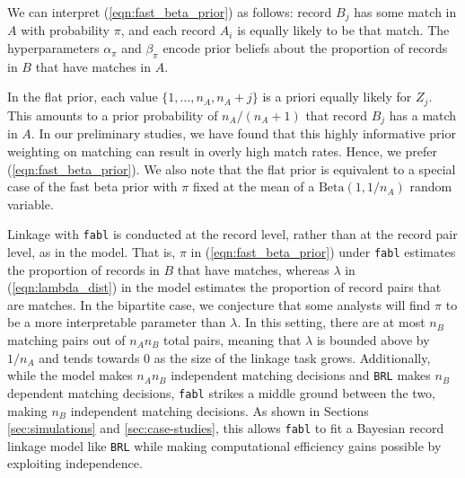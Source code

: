 \documentclass[ba]{imsart}
\begin{document}
We can interpret (\ref{eqn:fast_beta_prior}) as follows: record $B_j$ has some match in $A$ with probability $\pi$, and each record $A_i$ is equally likely to be that match. The hyperparameters $\alpha_{\pi}$ and $\beta_{\pi}$ encode prior beliefs about  the proportion of records in $B$ that have matches in $A.$ 

In the \cite{wortman2019} flat prior, each value $\{1, \ldots, n_A, n_A +j\}$ is a priori equally likely for $Z_j$. This amounts to a prior probability of $n_A / (n_A + 1)$ that record $B_j$ has a match in $A$. In our preliminary studies, we have found that this highly informative prior weighting on matching can result in overly high match rates. Hence, we prefer (\ref{eqn:fast_beta_prior}). We also note that the flat prior is equivalent to a special case of the fast beta prior with $\pi$ fixed at the mean of a $\text{Beta}\left(1, 1 / n_A \right)$ random variable.

Linkage with \texttt{fabl} is conducted at the record level, rather than at the record pair level, as in the \cite{fellegi_theory_1969} model. That is, $\pi$  in (\ref{eqn:fast_beta_prior}) under \texttt{fabl} estimates the proportion of records in $B$ that have matches, whereas $\lambda$ in (\ref{eqn:lambda_dist}) in the \cite{fellegi_theory_1969} model estimates the proportion of record pairs that are matches. In the bipartite case, we conjecture that some analysts will find $\pi$ to be a more interpretable parameter than $\lambda$. In this setting, there are at most $n_B$ matching pairs out of $n_A n_B$ total pairs, meaning that $\lambda$ is bounded above by $1/n_A$ and tends towards 0 as the size of the linkage task grows. Additionally, while the \cite{fellegi_theory_1969} model makes $n_A  n_B$ independent matching decisions and \texttt{BRL} makes $n_B$ dependent matching decisions, \texttt{fabl} strikes a middle ground between the two, making $n_B$  independent matching decisions. As shown in Sections \ref{sec:simulations} and \ref{sec:case-studies}, this allows \texttt{fabl} to fit a Bayesian record linkage model like \texttt{BRL} while making computational efficiency gains possible by exploiting independence. 
\end{document}
